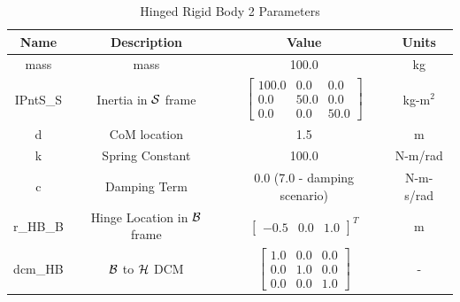 \begin{table}[htbp]
	\caption{Hinged Rigid Body 2 Parameters}
	\label{tab:panel2}
	\centering \fontsize{10}{10}\selectfont
	\begin{tabular}{| c | c | c | c |} %
		\hline
		\textbf{Name}  & \textbf{Description}  & \textbf{Value} & \textbf{Units} \\
		\hline
		mass  & mass & 100.0 & kg \\
		\hline
		IPntS\_S & Inertia in $\cal{S}$ frame & $\begin{bmatrix}
		100.0 & 0.0 & 0.0\\
		0.0 & 50.0 & 0.0\\
		0.0 & 0.0 & 50.0
		\end{bmatrix}$ & kg-m$^2$ \\
		\hline
		d & CoM location & 1.5 & m \\
		\hline
		k & Spring Constant & 100.0 & N-m/rad \\
		\hline
		c & Damping Term & 0.0 (7.0 - damping scenario) & N-m-s/rad \\
		\hline
		r\_HB\_B & Hinge Location in $\cal{B}$ frame & $\begin{bmatrix}
		-0.5 & 0.0 & 1.0 \end{bmatrix}^T$ & m \\
		\hline
		dcm\_HB & $\cal{B}$ to $\cal{H}$ DCM & $\begin{bmatrix}
		1.0 & 0.0 & 0.0\\
		0.0 & 1.0 & 0.0\\
		0.0 & 0.0 & 1.0
		\end{bmatrix}$ & - \\
		\hline
	\end{tabular}
\end{table}

